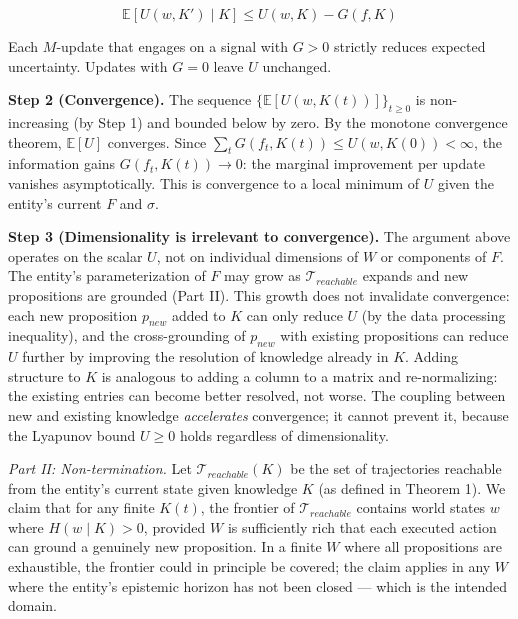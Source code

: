 \documentclass[
]{article}
\begin{document}
\[\mathbb{E}[U(w, K') \mid K] \leq U(w, K) - G(f, K)\]

Each \(M\)-update that engages on a signal with \(G > 0\) strictly
reduces expected uncertainty. Updates with \(G = 0\) leave \(U\)
unchanged.

\textbf{Step 2 (Convergence).} The sequence
\(\{\mathbb{E}[U(w, K(t))]\}_{t \geq 0}\) is non-increasing (by Step 1)
and bounded below by zero. By the monotone convergence theorem,
\(\mathbb{E}[U]\) converges. Since
\(\sum_t G(f_t, K(t)) \leq U(w, K(0)) < \infty\), the information gains
\(G(f_t, K(t)) \to 0\): the marginal improvement per update vanishes
asymptotically. This is convergence to a local minimum of \(U\) given
the entity's current \(F\) and \(\sigma\).

\textbf{Step 3 (Dimensionality is irrelevant to convergence).} The
argument above operates on the scalar \(U\), not on individual
dimensions of \(W\) or components of \(F\). The entity's
parameterization of \(F\) may grow as
\(\mathcal{T}_{reachable}\) expands and new propositions are grounded
(Part II). This growth does not invalidate convergence: each new
proposition \(p_{new}\) added to \(K\) can only reduce \(U\) (by the
data processing inequality), and the cross-grounding of \(p_{new}\) with
existing propositions can reduce \(U\) further by improving the
resolution of knowledge already in \(K\). Adding structure to \(K\) is
analogous to adding a column to a matrix and re-normalizing: the
existing entries can become better resolved, not worse. The coupling
between new and existing knowledge \emph{accelerates} convergence; it
cannot prevent it, because the Lyapunov bound \(U \geq 0\) holds
regardless of dimensionality.

\emph{Part II: Non-termination.} Let \(\mathcal{T}_{reachable}(K)\) be
the set of trajectories reachable from the entity's current state given
knowledge \(K\) (as defined in Theorem 1). We claim that for any finite
\(K(t)\), the frontier of \(\mathcal{T}_{reachable}\) contains world
states \(w\) where \(H(w \mid K) > 0\), provided \(W\) is sufficiently
rich that each executed action can ground a genuinely new proposition.
In a finite \(W\) where all propositions are exhaustible, the frontier
could in principle be covered; the claim applies in any \(W\) where the
entity's epistemic horizon has not been closed --- which is the intended
domain.
\end{document}
